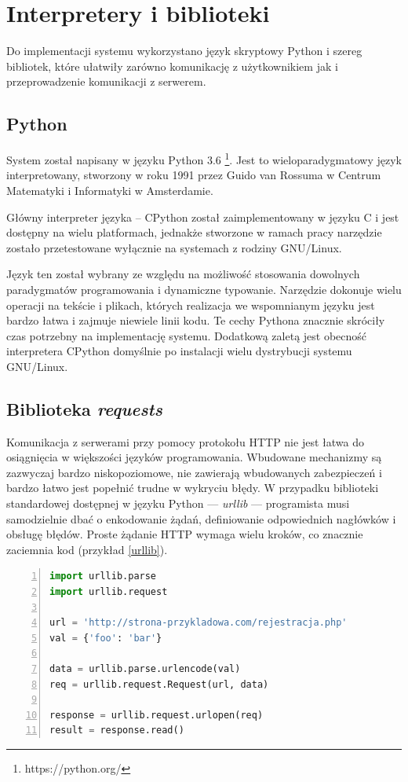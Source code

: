 \documentclass[11pt,a4paper,polish,thesis,oneside]{dcsbook}
\begin{document}
\section{Interpretery i biblioteki}
Do implementacji systemu wykorzystano język skryptowy Python i szereg bibliotek, które ułatwiły zarówno komunikację z użytkownikiem jak i przeprowadzenie komunikacji z serwerem.

\subsection{Python}
System został napisany w języku Python 3.6 \footnote{https://python.org/}. Jest to wieloparadygmatowy język interpretowany, stworzony w roku 1991 przez Guido van Rossuma w Centrum Matematyki i Informatyki w Amsterdamie.

Główny interpreter języka -- CPython został zaimplementowany w języku C i jest dostępny na wielu platformach, jednakże stworzone w ramach pracy narzędzie zostało przetestowane wyłącznie na systemach z rodziny GNU/Linux.

Język ten został wybrany ze względu na możliwość stosowania dowolnych paradygmatów programowania i dynamiczne typowanie. Narzędzie dokonuje wielu operacji na tekście i plikach, których realizacja we wspomnianym języku jest bardzo łatwa i zajmuje niewiele linii kodu. Te cechy Pythona znacznie skróciły czas potrzebny na implementację systemu. Dodatkową zaletą jest obecność interpretera CPython domyślnie po instalacji wielu dystrybucji systemu GNU/Linux.

\subsection{Biblioteka \textit{requests}}
Komunikacja z serwerami przy pomocy protokołu HTTP nie jest łatwa do osiągnięcia w większości języków programowania. Wbudowane mechanizmy są zazwyczaj bardzo niskopoziomowe, nie zawierają wbudowanych zabezpieczeń i bardzo łatwo jest popełnić trudne w wykryciu błędy. W przypadku biblioteki standardowej dostępnej w języku Python --- \textit{urllib} --- programista musi samodzielnie dbać o enkodowanie żądań, definiowanie odpowiednich nagłówków i obsługę błędów. Proste żądanie HTTP wymaga wielu kroków, co znacznie zaciemnia kod (przykład \ref{urllib}).

\begin{lstlisting}[language=python,frame=single,caption=Wykorzystanie biblioteki urllib,label=urllib,numbers=left]
import urllib.parse
import urllib.request

url = 'http://strona-przykladowa.com/rejestracja.php'
val = {'foo': 'bar'}

data = urllib.parse.urlencode(val)
req = urllib.request.Request(url, data)

response = urllib.request.urlopen(req)
result = response.read()
\end{lstlisting}
\end{document}
